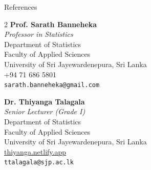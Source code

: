 \documentclass{resume} %
\begin{document}
	\begin{rSection}{References} 
		\begin{multicols}{2}
			\noindent
			\textbf{Prof. Sarath Banneheka} \\
			\textit{Professor in Statistics} \\
			Department of Statistics \\
			Faculty of Applied Sciences \\
			University of Sri Jayewardenepura,
			Sri Lanka \\
			+94 71 686 5801 \\
			\texttt{sarath.banneheka@gmail.com}
			
			\columnbreak
			
			\noindent
			\textbf{Dr. Thiyanga Talagala} \\
			\textit{Senior Lecturer (Grade I)} \\
			Department of Statistics \\
			Faculty of Applied Sciences \\
			University of Sri Jayewardenepura,
			Sri Lanka \\
			\href{https://thiyanga.netlify.app/}{thiyanga.netlify.app}\\
			\texttt{ttalagala@sjp.ac.lk }
		\end{multicols}
		
	\end{rSection}
	
\end{document}
